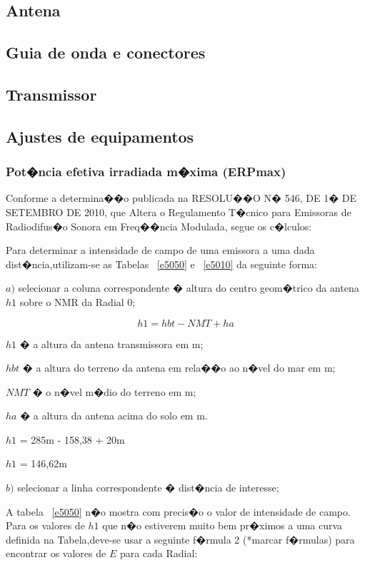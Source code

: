 \subsection{Antena}

\subsection{Guia de onda e conectores}

\subsection{Transmissor}

\subsection{Ajustes de equipamentos}

\subsubsection{Pot�ncia efetiva irradiada m�xima (ERPmax)}

Conforme a determina��o publicada na RESOLU��O N� 546, DE 1� DE SETEMBRO DE 2010, que Altera o Regulamento T�cnico para Emissoras de Radiodifus�o Sonora em Freq��ncia Modulada,
 segue os c�lculos:

Para determinar a intensidade de campo de uma emissora a uma dada dist�ncia,utilizam-se as Tabelas ~\ref{e5050} e ~\ref{e5010} da seguinte forma:

$a)$ selecionar a coluna correspondente � altura do centro geom�trico da antena $h1$ sobre o NMR da Radial 0;

$$h1 = hbt - NMT + ha$$

$h1$ � a altura da antena transmissora em m;

$hbt$ � a altura do terreno da antena em rela��o ao n�vel do mar em m;

$NMT$ � o n�vel m�dio do terreno em m;

$ha$ � a altura da antena acima do solo em m.

$h1$ = 285m - 158,38 + 20m

$h1$ = 146,62m


$b)$ selecionar a linha correspondente � dist�ncia de interesse;

 A tabela ~\ref{e5050} n�o mostra com precis�o o valor de intensidade de campo. 
Para os valores de $h1$ que n�o estiverem muito bem pr�ximos a uma curva definida na Tabela,deve-se usar a seguinte f�rmula 2 (*marcar f�rmulas) para encontrar os valores de $E$ 
para cada Radial:

